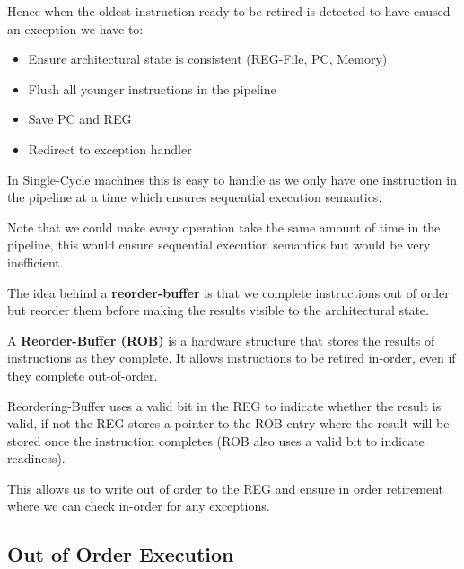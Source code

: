 Hence when the oldest instruction ready to be retired is detected to have caused an exception we have to:
\begin{itemize}
	\item Ensure architectural state is consistent (REG-File, PC, Memory)
	\item Flush all younger instructions in the pipeline
	\item Save PC and REG
	\item Redirect to exception handler
\end{itemize}

\begin{remark}
	In Single-Cycle machines this is easy to handle as we only have one instruction in the pipeline at a time which ensures sequential execution semantics.
\end{remark}

\begin{remark}
	Note that we could make every operation take the same amount of time in the pipeline, this would ensure sequential execution semantics but would be very inefficient.
\end{remark}


\begin{remark}
	The idea behind a \textbf{reorder-buffer} is that we complete instructions out of order but reorder them before making the results visible to the architectural state.
\end{remark}

\begin{definition}
	A \textbf{Reorder-Buffer (ROB)} is a hardware structure that stores the results of instructions as they complete. It allows instructions to be retired in-order, even if they complete out-of-order.
\end{definition}

\begin{lemma}
	Reordering-Buffer uses a valid bit in the REG to indicate whether the result is valid, if not the REG stores a pointer to the ROB entry where the result will be stored once the instruction completes (ROB also uses a valid bit to indicate readiness).
\end{lemma}

This allows us to write out of order to the REG and ensure in order retirement where we can check in-order for any exceptions.

\subsection{Out of Order Execution}


